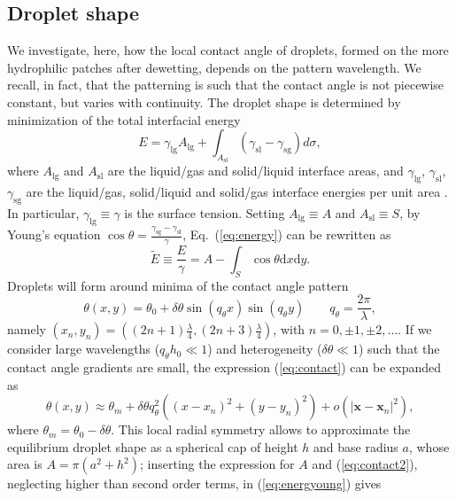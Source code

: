 \subsection{Droplet shape}

\noindent We investigate, here, how the local contact angle of droplets, formed on the more hydrophilic patches after dewetting, depends on the pattern wavelength. 
We recall, in fact, that the patterning is such that the contact angle is not piecewise constant, but varies with continuity.
The droplet shape is determined by minimization of the total interfacial energy
\begin{equation}\label{eq:energy}
  E = \gamma_{\text{lg}} A_{\text{lg}} + \int_{A_{\text{sl}}} (\gamma_{\text{sl}} - \gamma_{\text{sg}})d \sigma,
\end{equation}
where $A_{\text{lg}}$ and $A_{\text{sl}}$ are the liquid/gas and solid/liquid interface areas, and $\gamma_{\text{lg}}$, $\gamma_{\text{sl}}$, $\gamma_{\text{sg}}$ are the liquid/gas, solid/liquid and solid/gas interface energies per unit area \cite{wuHowChemicalPatterns2020}. 
In particular, $\gamma_{\text{lg}} \equiv \gamma$ is the surface tension.
Setting $A_{\text{lg}} \equiv A$ and $A_{\text{sl}} \equiv S$, by Young's equation $\cos \theta = \frac{\gamma_{\text{sg}} - \gamma_{\text{sl}}}{\gamma}$, Eq.~(\ref{eq:energy}) can be rewritten as
\begin{equation}\label{eq:energyoung}
  \tilde{E} \equiv \frac{E}{\gamma} = A - \int_S \cos \theta \text{d}x \text{d}y.
\end{equation}
Droplets will form around minima of the contact angle pattern
\begin{equation}\label{eq:contact}
  \theta(x,y) = \theta_0 + \delta \theta \sin(q_{\theta} x) \sin (q_{\theta} y) \qquad q_{\theta} = \frac{2\pi}{\lambda},
\end{equation}
namely $(x_n,y_n) = \left((2n+1)\frac{\lambda}{4},(2n+3)\frac{\lambda}{4}\right)$, with $n=0,\pm 1, \pm 2,\dots$.
If we consider large wavelengths ($q_{\theta} h_0 \ll 1$) and heterogeneity ($\delta \theta \ll 1$) such that the contact angle gradients are small, the
expression (\ref{eq:contact}) can be expanded as
\begin{equation}\label{eq:contact2}
  \theta(x,y) \approx \theta_m + \delta \theta q_{\theta}^2 ((x-x_n)^2 + (y - y_n)^2) + o(|\mathbf{x}-\mathbf{x}_n|^2),
\end{equation}
where $\theta_m = \theta_0 - \delta \theta$.
This local radial symmetry allows to approximate the equilibrium droplet shape as a spherical cap of height $h$ and base radius $a$, whose area is $A = \pi(a^2 + h^2)$; inserting the expression for $A$ and (\ref{eq:contact2}), neglecting higher than second order terms, in (\ref{eq:energyoung}) gives
